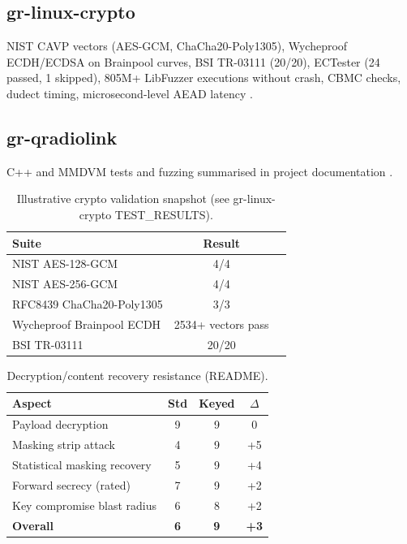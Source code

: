 \documentclass[10pt,a4paper,twocolumn]{article}
\begin{document}
\subsection{gr-linux-crypto}
NIST CAVP vectors (AES-GCM, ChaCha20-Poly1305), Wycheproof ECDH/ECDSA on Brainpool curves, BSI TR-03111 (20/20), ECTester (24 passed, 1 skipped), 805M+ LibFuzzer executions without crash, CBMC checks, dudect timing, microsecond-level AEAD latency \cite{repo_crypto_results}.

\subsection{gr-qradiolink}
C++ and MMDVM tests and fuzzing summarised in project documentation \cite{repo_qrl}.

\begin{table}[H]
\centering
\caption{Illustrative crypto validation snapshot (see gr-linux-crypto TEST\_RESULTS).}
\small
\begin{tabular}{@{}lcc@{}}
\toprule
Suite & Result \\
\midrule
NIST AES-128-GCM & 4/4 \\
NIST AES-256-GCM & 4/4 \\
RFC8439 ChaCha20-Poly1305 & 3/3 \\
Wycheproof Brainpool ECDH & 2534+ vectors pass \\
BSI TR-03111 & 20/20 \\
\bottomrule
\end{tabular}
\end{table}

\begin{table}[H]
\centering
\caption{Decryption/content recovery resistance (README).}
\scriptsize
\begin{tabular}{@{}lccc@{}}
\toprule
Aspect & Std & Keyed & $\Delta$ \\
\midrule
Payload decryption & 9 & 9 & 0 \\
Masking strip attack & 4 & 9 & +5 \\
Statistical masking recovery & 5 & 9 & +4 \\
Forward secrecy (rated) & 7 & 9 & +2 \\
Key compromise blast radius & 6 & 8 & +2 \\
\midrule
\textbf{Overall} & \textbf{6} & \textbf{9} & \textbf{+3} \\
\bottomrule
\end{tabular}
\end{table}
\end{document}
